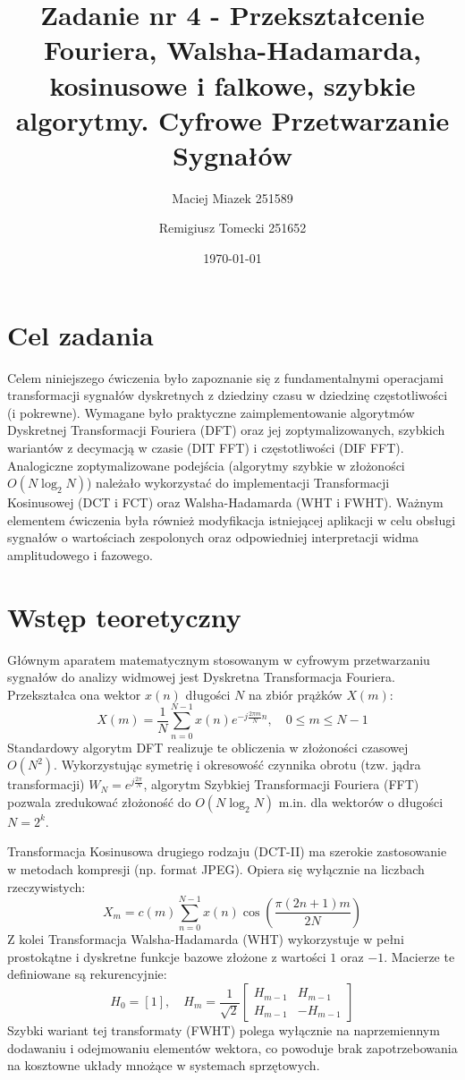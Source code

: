 \documentclass[12pt]{article}
\title{{\bf Zadanie nr 4 - Przekształcenie Fouriera, Walsha-Hadamarda, kosinusowe i falkowe,
szybkie algorytmy.}\linebreak
Cyfrowe Przetwarzanie Sygnałów}
\author{Maciej Miazek 251589 \and Remigiusz Tomecki 251652}
\date{\today}
\begin{document}
\clearpage\maketitle
\thispagestyle{empty}
\newpage
\setcounter{page}{1}

\section{Cel zadania}
Celem niniejszego ćwiczenia było zapoznanie się z fundamentalnymi operacjami transformacji sygnałów dyskretnych z dziedziny czasu w dziedzinę częstotliwości (i pokrewne). Wymagane było praktyczne zaimplementowanie algorytmów Dyskretnej Transformacji Fouriera (DFT) oraz jej zoptymalizowanych, szybkich wariantów z decymacją w czasie (DIT FFT) i częstotliwości (DIF FFT). Analogiczne zoptymalizowane podejścia (algorytmy szybkie w złożoności $O(N \log_2 N)$) należało wykorzystać do implementacji Transformacji Kosinusowej (DCT i FCT) oraz Walsha-Hadamarda (WHT i FWHT). Ważnym elementem ćwiczenia była również modyfikacja istniejącej aplikacji w celu obsługi sygnałów o wartościach zespolonych oraz odpowiedniej interpretacji widma amplitudowego i fazowego.

\section{Wstęp teoretyczny}
Głównym aparatem matematycznym stosowanym w cyfrowym przetwarzaniu sygnałów do analizy widmowej jest Dyskretna Transformacja Fouriera. Przekształca ona wektor $x(n)$ długości $N$ na zbiór prążków $X(m)$:
\begin{equation}
X(m) = \frac{1}{N} \sum_{n=0}^{N-1} x(n) e^{-j \frac{2\pi m}{N} n}, \quad 0 \le m \le N-1
\end{equation}
Standardowy algorytm DFT realizuje te obliczenia w złożoności czasowej $O(N^2)$. Wykorzystując symetrię i okresowość czynnika obrotu (tzw. jądra transformacji) $W_N = e^{j \frac{2\pi}{N}}$, algorytm Szybkiej Transformacji Fouriera (FFT) pozwala zredukować złożoność do $O(N \log_2 N)$ m.in. dla wektorów o długości $N=2^k$.

Transformacja Kosinusowa drugiego rodzaju (DCT-II) ma szerokie zastosowanie w metodach kompresji (np. format JPEG). Opiera się wyłącznie na liczbach rzeczywistych:
\begin{equation}
X_m = c(m) \sum_{n=0}^{N-1} x(n) \cos\left( \frac{\pi (2n+1) m}{2N} \right)
\end{equation}
Z kolei Transformacja Walsha-Hadamarda (WHT) wykorzystuje w pełni prostokątne i dyskretne funkcje bazowe złożone z wartości $1$ oraz $-1$. Macierze te definiowane są rekurencyjnie:
\begin{equation}
H_0 = [1], \quad H_m = \frac{1}{\sqrt{2}} \begin{bmatrix} H_{m-1} & H_{m-1} \\ H_{m-1} & -H_{m-1} \end{bmatrix}
\end{equation}
Szybki wariant tej transformaty (FWHT) polega wyłącznie na naprzemiennym dodawaniu i odejmowaniu elementów wektora, co powoduje brak zapotrzebowania na kosztowne układy mnożące w systemach sprzętowych.
\end{document}

